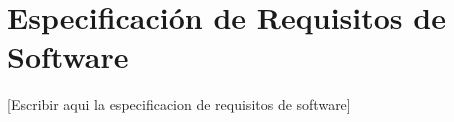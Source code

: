 
\section{Especificación de Requisitos de Software}

[Escribir aqui la especificacion de requisitos de software]
